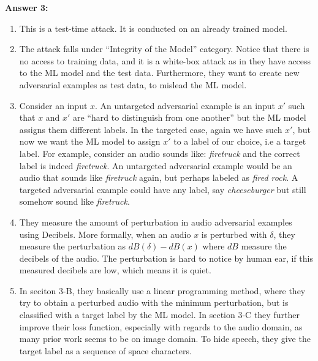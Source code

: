 \documentclass[12pt,reqno]{amsart}
\begin{document}
\textbf{Answer 3:}
\begin{enumerate}[label=(\alph*)]
\item This is a test-time attack. It is conducted on an already trained model.

\item The attack falls under ``Integrity of the Model'' category. Notice that there is no access to training data, and it is a white-box attack as in they have access to the ML model and the test data. Furthermore, they want to create new adversarial examples as test data, to mislead the ML model. 

\item Consider an input $x$. An untargeted adversarial example is an input $x'$ such that $x$ and $x'$ are ``hard to distinguish from one another'' but the ML model assigns them different labels. In the targeted case, again we have such $x'$, but now we want the ML model to assign $x'$ to a label of our choice, i.e a target label. For example, consider an audio sounds like: \textit{firetruck} and the correct label is indeed \textit{firetruck}. An untargeted adversarial example would be an audio that sounds like \textit{firetruck} again, but perhaps labeled as \textit{fired rock}. A targeted adversarial example could have any label, say \textit{cheeseburger} but still somehow sound like \textit{firetruck}.

\item They measure the amount of perturbation in audio adversarial examples using Decibels. More formally, when an audio $x$ is perturbed with $\delta$, they measure the perturbation as $dB(\delta)-dB(x)$ where $dB$ measure the decibels of the audio. The perturbation is hard to notice by human ear, if this measured decibels are low, which means it is quiet.

\item In seciton 3-B, they basically use a linear programming method, where they try to obtain a perturbed audio with the minimum perturbation, but is classified with a target label by the ML model. In section 3-C they further improve their loss function, especially with regards to the audio domain, as many prior work seems to be on image domain. To hide speech, they give the target label as a sequence of space characters.


\end{enumerate}
\end{document}
